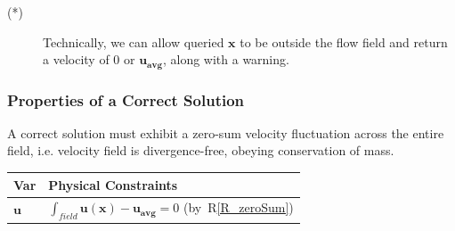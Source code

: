 \documentclass[12pt]{article}
\newcommand{\rref}[1]{R\ref{#1}}
\begin{document}
\noindent 
\begin{description}
\item[(*)] Technically, we can allow queried $\textbf{x}$ to be outside the flow field and return a velocity of 0 or $\mathbf{u_\text{avg}}$, along with a warning.
\end{description}


\subsubsection{Properties of a Correct Solution} \label{sec_CorrectSolution}

\noindent
A correct solution must exhibit a zero-sum velocity fluctuation across the entire field, i.e. velocity field is divergence-free, obeying conservation of mass.

\begin{table}[!h]
\caption{Output Variables} \label{TblOutputVar}
\renewcommand{\arraystretch}{1.2}
\noindent \begin{longtable*}{l l} 
  \toprule
  \textbf{Var} & \textbf{Physical Constraints} \\
  \midrule 
  $\textbf{u}$ & $\int_{field}\mathbf{u}(\mathbf{x})-\mathbf{u_\text{avg}} = 0$ (by~\rref{R_zeroSum})
  \\
  \bottomrule
\end{longtable*}
\end{table}

\end{document}
